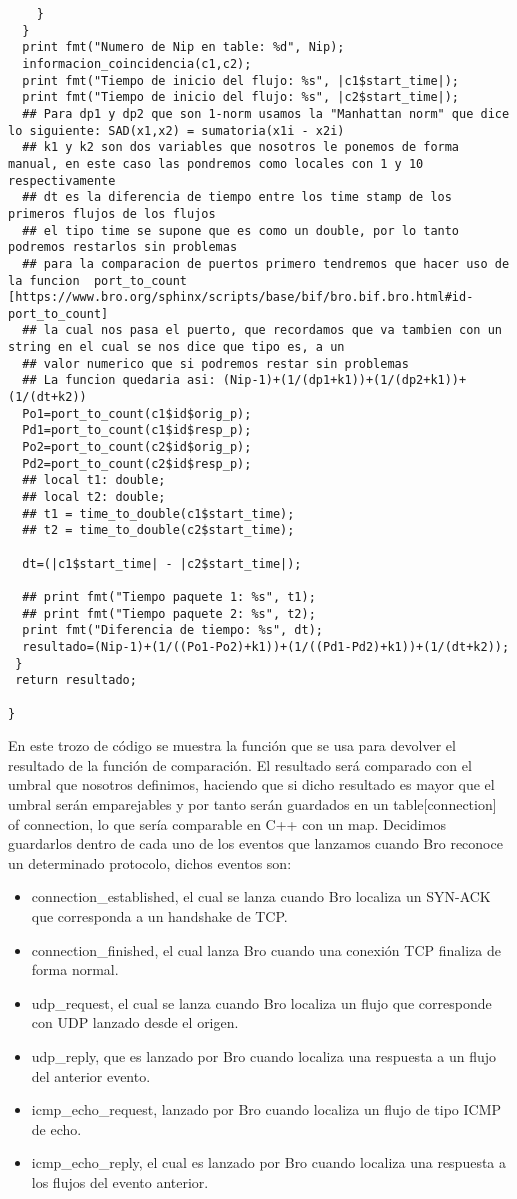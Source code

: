\begin{verbatim}
    }
  }
  print fmt("Numero de Nip en table: %d", Nip);
  informacion_coincidencia(c1,c2);
  print fmt("Tiempo de inicio del flujo: %s", |c1$start_time|);
  print fmt("Tiempo de inicio del flujo: %s", |c2$start_time|);
  ## Para dp1 y dp2 que son 1-norm usamos la "Manhattan norm" que dice lo siguiente: SAD(x1,x2) = sumatoria(x1i - x2i)
  ## k1 y k2 son dos variables que nosotros le ponemos de forma manual, en este caso las pondremos como locales con 1 y 10 respectivamente
  ## dt es la diferencia de tiempo entre los time stamp de los primeros flujos de los flujos
  ## el tipo time se supone que es como un double, por lo tanto podremos restarlos sin problemas
  ## para la comparacion de puertos primero tendremos que hacer uso de la funcion  port_to_count [https://www.bro.org/sphinx/scripts/base/bif/bro.bif.bro.html#id-port_to_count]
  ## la cual nos pasa el puerto, que recordamos que va tambien con un string en el cual se nos dice que tipo es, a un
  ## valor numerico que si podremos restar sin problemas
  ## La funcion quedaria asi: (Nip-1)+(1/(dp1+k1))+(1/(dp2+k1))+(1/(dt+k2))
  Po1=port_to_count(c1$id$orig_p);
  Pd1=port_to_count(c1$id$resp_p);
  Po2=port_to_count(c2$id$orig_p);
  Pd2=port_to_count(c2$id$resp_p);
  ## local t1: double;
  ## local t2: double;
  ## t1 = time_to_double(c1$start_time);
  ## t2 = time_to_double(c2$start_time);

  dt=(|c1$start_time| - |c2$start_time|);

  ## print fmt("Tiempo paquete 1: %s", t1);
  ## print fmt("Tiempo paquete 2: %s", t2);
  print fmt("Diferencia de tiempo: %s", dt);
  resultado=(Nip-1)+(1/((Po1-Po2)+k1))+(1/((Pd1-Pd2)+k1))+(1/(dt+k2));
 }
 return resultado;

}
\end{verbatim}
En este trozo de código se muestra la función que se usa para devolver 
el resultado de la función de comparación. El resultado será comparado 
con el umbral que nosotros definimos, haciendo que si dicho resultado 
es mayor que el umbral serán emparejables y por tanto serán guardados 
en un table[connection] of connection, lo que sería comparable en C++ 
con un map. Decidimos guardarlos dentro de cada uno de los eventos que 
lanzamos cuando Bro reconoce un determinado protocolo, dichos eventos son:
\intro
\begin{itemize}
\item connection\_established, el cual se lanza cuando Bro localiza un SYN-ACK que corresponda a un handshake de TCP.
\item connection\_finished, el cual lanza Bro cuando una conexión TCP finaliza de forma normal. 
\item udp\_request, el cual se lanza cuando Bro localiza un flujo que corresponde con UDP lanzado desde el origen.
\item udp\_reply, que es lanzado por Bro cuando localiza una respuesta a un flujo del anterior evento.
\item icmp\_echo\_request, lanzado por Bro cuando localiza un flujo de tipo ICMP de echo.
\item icmp\_echo\_reply, el cual es lanzado por Bro cuando localiza una respuesta a los flujos del evento anterior.
\end{itemize}

